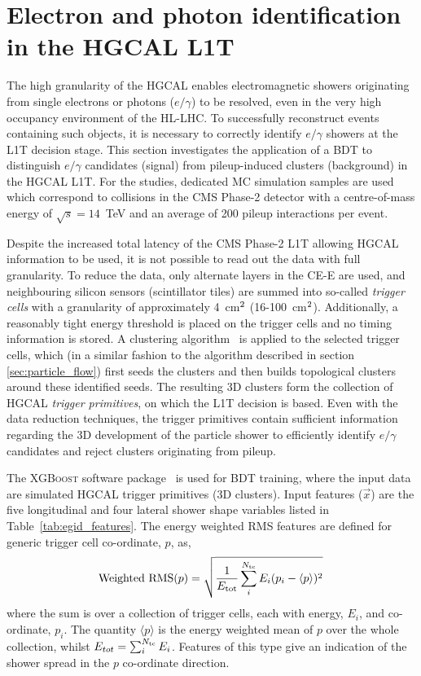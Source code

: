 \section{Electron and photon identification in the HGCAL L1T}\label{sec:egid}
The high granularity of the HGCAL enables electromagnetic showers originating from single electrons or photons ($e/\gamma$) to be resolved, even in the very high occupancy environment of the HL-LHC. To successfully reconstruct events containing such objects, it is necessary to correctly identify $e/\gamma$ showers at the L1T decision stage. This section investigates the application of a BDT to distinguish $e/\gamma$ candidates (signal) from pileup-induced clusters (background) in the HGCAL L1T. For the studies, dedicated MC simulation samples are used which correspond to collisions in the CMS Phase-2 detector with a centre-of-mass energy of $\sqrt{s}=14$~TeV and an average of 200 pileup interactions per event.

Despite the increased total latency of the CMS Phase-2 L1T allowing HGCAL information to be used, it is not possible to read out the data with full granularity. To reduce the data, only alternate layers in the CE-E are used, and neighbouring silicon sensors (scintillator tiles) are summed into so-called \textit{trigger cells} with a granularity of approximately 4~cm$^{\rm{2}}$ (16-100~cm$^{\rm{2}}$). Additionally, a reasonably tight energy threshold is placed on the trigger cells and no timing information is stored. A clustering algorithm~\cite{CERN-LHCC-2020-004} is applied to the selected trigger cells, which (in a similar fashion to the algorithm described in section \ref{sec:particle_flow}) first seeds the clusters and then builds topological clusters around these identified seeds. The resulting 3D clusters form the collection of HGCAL \textit{trigger primitives}, on which the L1T decision is based. Even with the data reduction techniques, the trigger primitives contain sufficient information regarding the 3D development of the particle shower to efficiently identify $e/\gamma$ candidates and reject clusters originating from pileup.

The \textsc{XGBoost} software package~\cite{10.1145/2939672.2939785} is used for BDT training, where the input data are simulated HGCAL trigger primitives (3D clusters). Input features ($\vec{x}$) are the five longitudinal and four lateral shower shape variables listed in Table~\ref{tab:egid_features}. The energy weighted RMS features are defined for generic trigger cell co-ordinate, $p$, as,
\begin{equation}
    {\rm{Weighted}\,\,\rm{RMS}}(p) = \sqrt{\frac{1}{E_{\rm{tot}}}\sum^{N_{\rm{tc}}}_{i} E_i (p_i-\langle p \rangle)^2}\,
\end{equation}
\noindent
where the sum is over a collection of trigger cells, each with energy, $E_i$, and co-ordinate, $p_i$. The quantity $\langle p \rangle$ is the energy weighted mean of $p$ over the whole collection, whilst $E_{tot}=\sum^{N_{\rm{tc}}}_iE_i$. Features of this type give an indication of the shower spread in the $p$ co-ordinate direction.

